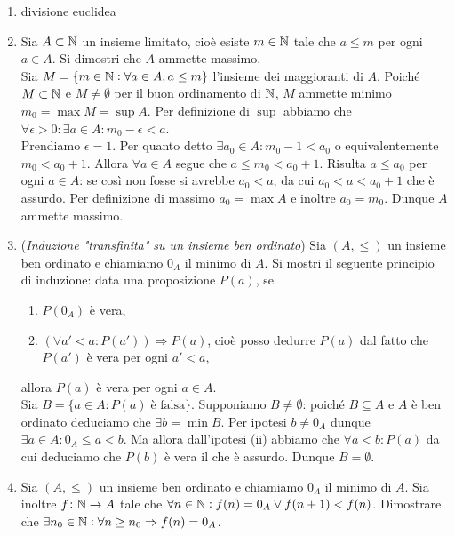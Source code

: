 \begin{enumerate}
\item \textsf{divisione euclidea}
\item Sia $ A \subset \mathbb{N} $ un insieme limitato, cioè esiste $ m \in \mathbb{N} $ tale che $ a \leq m $ per ogni $ a \in A $. Si dimostri che $ A $ ammette massimo. \\

  Sia $ M = \{m \in \mathbb{N} : \forall a \in A, a \leq m\} $ l'insieme dei maggioranti di $ A $. Poiché $ M \subset \mathbb{N} $ e $ M \neq \emptyset $ per il buon ordinamento di $ \mathbb{N} $, $ M $ ammette minimo $ m_0 = \max M = \sup A $. Per definizione di $ \sup $ abbiamo che $ \forall \epsilon > 0 : \exists a \in A : m_0 - \epsilon < a $. \\
  Prendiamo $ \epsilon = 1 $. Per quanto detto $ \exists a_0 \in A : m_0 - 1 < a_0 $ o equivalentemente $ m_0 < a_0 + 1 $. Allora $ \forall a \in A $ segue che $ a \leq m_0 < a_0 + 1 $. Risulta $ a \leq a_0 $ per ogni $ a \in A $: se così non fosse si avrebbe $ a_0 < a $, da cui $ a_0 < a < a_0 + 1 $ che è assurdo. Per definizione di massimo $ a_0 = \max A $ e inoltre $ a_0 = m_0 $. Dunque $ A $ ammette massimo.
\item (\emph{Induzione "transfinita" su un insieme ben ordinato}) Sia $ (A, \leq) $ un insieme ben ordinato e chiamiamo $ 0_A $ il minimo di $ A $. Si mostri il seguente principio di induzione: data una proposizione $ P(a) $, se
  \begin{enumerate}[label=(\roman*)]
  \item $ P(0_A) $ è vera,
  \item $ (\forall a' < a : P(a')) \Rightarrow P(a) $, cioè posso dedurre $ P(a) $ dal fatto che $ P(a') $ è vera per ogni $ a' < a $,
  \end{enumerate}
  allora $ P(a) $ è vera per ogni $ a \in A $. \\

  Sia $ B = \{a \in A : P(a) \; \text{è falsa}\} $. Supponiamo $ B \neq \emptyset $: poiché $ B \subseteq A $ e $ A $ è ben ordinato deduciamo che $ \exists b = \min B $. Per ipotesi $ b \neq 0_A $ dunque $ \exists a \in A : 0_A \leq a < b $. Ma allora dall'ipotesi (ii) abbiamo che $ \forall a < b : P(a) $ da cui deduciamo che $ P(b) $ è vera il che è assurdo. Dunque $ B = \emptyset $.
\item Sia $ (A, \leq) $ un insieme ben ordinato e chiamiamo $ 0_A $ il minimo di $ A $. Sia inoltre $ f \colon \mathbb{N} \to A $ tale che $ \forall n \in \mathbb{N} : f(n) = 0_A \vee f(n + 1) < f(n) $. Dimostrare che $ \exists n_0 \in \mathbb{N} : \forall n \geq n_0 \Rightarrow f(n) = 0_A $. \\


\end{enumerate}
